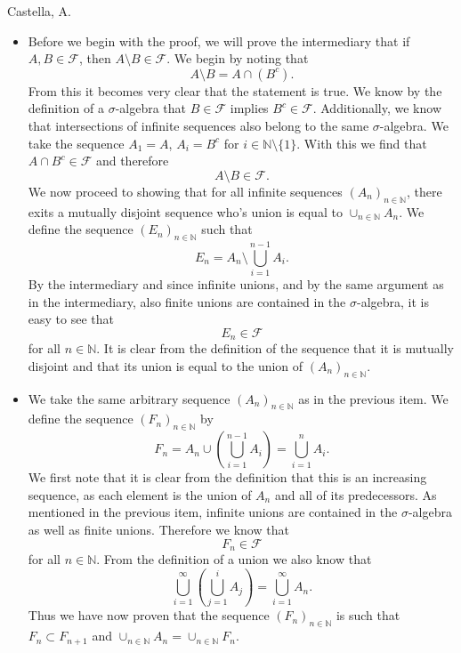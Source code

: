 \begin{solution}[2.5]{Castella, A.}
\begin{itemize}
    \item Before we begin with the proof, we will prove the intermediary that if $A,B \in \mathcal{F}$, then $A \setminus B \in \mathcal{F}$. We begin by noting that
    $$
        A \setminus B = A \cap (B^c).
    $$
    From this it becomes very clear that the statement is true. We know by the definition of a $\sigma$-algebra that $B \in \mathcal{F}$ implies $B^c \in \mathcal{F}$. Additionally, we know that intersections of infinite sequences also belong to the same $\sigma$-algebra. We take the sequence $A_1 = A$, $A_i = B^c$ for $i \in \mathbb{N}\setminus\{1\}$. With this we find that $A \cap B^c \in \mathcal{F}$ and therefore
    $$
        A\setminus B \in \mathcal{F}.
    $$
    We now proceed to showing that for all infinite sequences $(A_n)_{n\in\mathbb{N}}$, there exits a mutually disjoint sequence who's union is equal to $\cup_{n\in\mathbb{N}}A_n$. We define the sequence $(E_n)_{n\in\mathbb{N}}$ such that
    $$
        E_n = A_n \setminus \bigcup_{i=1}^{n-1}A_i.
    $$
    By the intermediary and since infinite unions, and by the same argument as in the intermediary, also finite unions are contained in the $\sigma$-algebra, it is easy to see that
    $$
        E_n \in \mathcal{F}
    $$
    for all $n\in\mathbb{N}$. It is clear from the definition of the sequence that it is mutually disjoint and that its union is equal to the union of $(A_n)_{n\in\mathbb{N}}$.
    \item We take the same arbitrary sequence $(A_n)_{n\in\mathbb{N}}$ as in the previous item. We define the sequence $(F_n)_{n\in\mathbb{N}}$ by
    $$
        F_n = A_n \cup \left(\bigcup_{i=1}^{n-1}A_i\right) = \bigcup_{i=1}^n A_i.
    $$
    We first note that it is clear from the definition that this is an increasing sequence, as each element is the union of $A_n$ and all of its predecessors. As mentioned in the previous item, infinite unions are contained in the $\sigma$-algebra as well as finite unions. Therefore we know that
    $$
        F_n \in \mathcal{F}
    $$
    for all $n \in \mathbb{N}$. From the definition of a union we also know that
    $$
        \bigcup_{i=1}^\infty \left(\bigcup_{j=1}^i A_j\right) = \bigcup_{i=1}^\infty A_n.
    $$
    Thus we have now proven that the sequence $(F_n)_{n\in\mathbb{N}}$ is such that $F_n \subset F_{n+1}$ and $\cup_{n\in\mathbb{N}}A_n = \cup_{n\in\mathbb{N}}F_n$.
\end{itemize}
\end{solution}